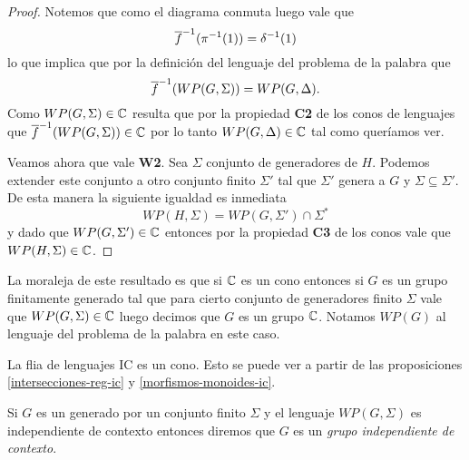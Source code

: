 \documentclass[tesis.tex]{subfiles}
\begin{document}
\begin{proof}
	
	Notemos que como el diagrama conmuta luego vale que 
	\[
	\overline{f}^{-1}(\pi^{-1}(1)) = \delta^{-1}(1)
	\]
	lo que implica que por la definición del lenguaje del problema de la palabra que
	\[
	\overline{f}^{-1}(WP(G,\Sigma)) = WP(G, \Delta).
	\]
	Como $WP(G, \Sigma) \in \mathbb{C}$ resulta que por la propiedad \textbf{C2} de los conos de lenguajes que $\overline{f}^{-1}(WP(G,\Sigma)) \in \mathbb{C}$ por lo tanto $WP(G, \Delta) \in \mathbb{C}$ tal como queríamos ver.
	
	Veamos ahora que vale \textbf{W2}. 
	Sea $\Sigma$ conjunto de generadores de $H$.
	Podemos extender este conjunto a otro conjunto finito $\Sigma'$ tal que $\Sigma'$ genera a $G$ y $\Sigma \subseteq \Sigma'$. 
	De esta manera la siguiente igualdad es inmediata
	\[
	WP(H, \Sigma) = WP(G, \Sigma') \cap \Sigma^*
	\]
	y dado que $WP(G, \Sigma') \in \mathbb{C}$ entonces por la propiedad \textbf{C3} de los conos vale que $WP(H, \Sigma) \in \mathbb{C}$.
	
\end{proof}

La moraleja de este resultado es que si $\mathbb{C}$ es un cono entonces si $G$ es un grupo finitamente generado tal que para cierto conjunto de generadores finito $\Sigma$ vale que $WP(G, \Sigma) \in \mathbb{C}$ luego decimos que $G$ es un grupo $\mathbb{C}$.
Notamos $WP(G)$ al lenguaje del problema de la palabra en este caso. 

 



La flia de lenguajes $\text{IC}$ es un cono.
Esto se puede ver a partir de las proposiciones  \ref{intersecciones-reg-ic} y \ref{morfismos-monoides-ic}.

\begin{deff}
	Si $G$ es un \fg generado por un conjunto finito $\Sigma$ y el lenguaje $WP(G, \Sigma)$ es independiente de contexto entonces diremos que $G$ es un \emph{grupo independiente de contexto}.
\end{deff}
\end{document}
